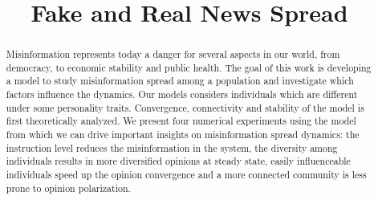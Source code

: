 \documentclass[11pt,conference]{IEEEtran}
\begin{document}
\title{Fake and Real News Spread \\}

\author{
\and
{}
\and
{}
}

\maketitle

\begin{abstract}
Misinformation represents today a danger for several aspects in our world, from democracy, to economic stability and public health. The goal of this work is developing a model to study misinformation spread among a population and investigate which factors influence the dynamics. Our models considers individuals which are different under some personality traits. Convergence, connectivity and stability of the model is first theoretically analyzed. We present four numerical experiments using the model from which we can drive important insights on misinformation spread dynamics: the instruction level reduces the misinformation in the system, the diversity among individuals results in more diversified opinions at steady state, easily influenceable individuals speed up the opinion convergence and a more connected community is less prone to opinion polarization.
\end{abstract}









\cleardoublepage
\appendix



\end{document}
